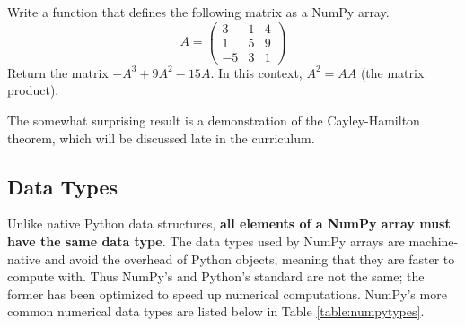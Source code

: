 \begin{problem} %
Write a function that defines the following matrix as a NumPy array.
\[
A = \left(\begin{array}{rrr}
3 & 1 & 4\\ 
1 & 5 & 9 \\
-5 & 3 & 1 \end{array}\right)
\]
Return the matrix $-A^3 + 9A^2 - 15A$.
In this context, $A^2 = AA$ (the matrix product).

The somewhat surprising result is a demonstration of the Cayley-Hamilton theorem, which will be discussed late in the curriculum.
\label{prob:simple2}
\end{problem}

\subsection*{Data Types} %

Unlike native Python data structures, \textbf{all elements of a NumPy array must have the same data type}. 
The data types used by NumPy arrays are machine-native and avoid the overhead of Python objects, meaning that they are faster to compute with.
Thus NumPy's  and Python's standard  are not the same; the former has been optimized to speed up numerical computations.
NumPy's more common numerical data types are listed below in Table \ref{table:numpytypes}.

